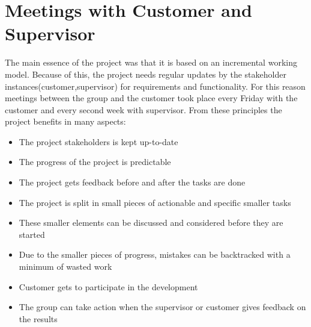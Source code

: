 \section{Meetings with Customer and Supervisor}
The main essence of the project was that it is based on an incremental working model. Because of this, the project needs regular updates by the stakeholder instances(customer,supervisor) for requirements and functionality. For this reason meetings between the group and the customer took place every Friday with the customer and every second week with supervisor.   
From these principles the project benefits in many aspects:
\begin{itemize}
\item The project stakeholders is kept up-to-date
\item The progress of the project is predictable
\item The project gets feedback before and after the tasks are done
\item The project is split in small pieces of actionable and specific smaller tasks
\item These smaller elements can be discussed and considered before they are started
\item Due to the smaller pieces of progress, mistakes can be backtracked with a minimum of wasted work
\item Customer gets to participate in the development
\item The group can take action when the supervisor or customer gives feedback on the results
\end{itemize}

